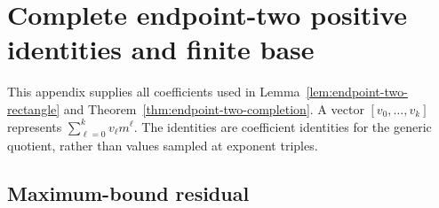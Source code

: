 \section{Complete endpoint-two positive identities and finite base}
\label{sec:endpoint-two-identities}

This appendix supplies all coefficients used in
Lemma~\ref{lem:endpoint-two-rectangle} and
Theorem~\ref{thm:endpoint-two-completion}. A vector
$[v_0,\ldots,v_k]$ represents $\sum_{\ell=0}^k v_\ell m^\ell$.
The identities are coefficient identities for the generic quotient,
rather than values sampled at exponent triples.

\subsection{Maximum-bound residual}

